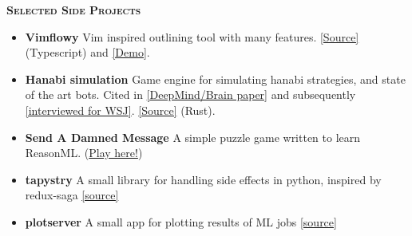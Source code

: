 \documentclass[11 pt]{article}
\begin{document}
\begin{center}\begin{Large}\textsc{\textbf{Selected Side Projects}\\}\end{Large}\end{center}

\begin{itemize}
\item \textbf{Vimflowy}
Vim inspired outlining tool with many features. \href{https://github.com/WuTheFWasThat/vimflowy}{[Source]} (Typescript) and \href{https://wuthejeff.com/vimflowy}{[Demo]}.

\item \textbf{Hanabi simulation}
  Game engine for simulating hanabi strategies, and state of the art bots.  Cited in \href{https://arxiv.org/abs/1902.00506}{[DeepMind/Brain paper]} and subsequently \href{https://www.wsj.com/articles/why-the-card-game-hanabi-is-the-next-big-hurdle-for-artificial-intelligence-11553875351?mod=rsswn}{[interviewed for WSJ]}. \href{https://github.com/WuTheFWasThat/hanabi.rs}{[Source]} (Rust).



\item \textbf{Send A Damned Message}
A simple puzzle game written to learn ReasonML. (\href{https://www.wuthejeff.com/send-a-damned-message}{Play here!})

\item \textbf{tapystry}
A small library for handling side effects in python, inspired by redux-saga \href{https://github.com/WuTheFWasThat/tapystry}{[source]}

\item \textbf{plotserver}
A small app for plotting results of ML jobs \href{https://github.com/WuTheFWasThat/plotserver}{[source]}


\end{itemize}
\end{document}
